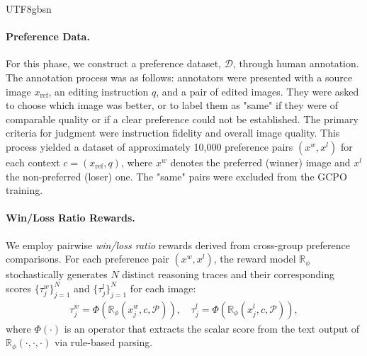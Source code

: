 \documentclass{llmxive}
\begin{document}
\begin{CJK*}{UTF8}{gbsn}
\vspace{-.5em}
\paragraph{Preference Data.}
For this phase, we construct a preference dataset, $\mathcal{D}$, through human annotation. The annotation process was as follows: annotators were presented with a source image $x_{\mathrm{ref}}$, an editing instruction $q$, and a pair of edited images. They were asked to choose which image was better, or to label them as "same" if they were of comparable quality or if a clear preference could not be established. The primary criteria for judgment were instruction fidelity and overall image quality. This process yielded a dataset of approximately 10,000 preference pairs $(x^w, x^l)$ for each context $c=(x_{\mathrm{ref}}, q)$, where $x^w$ denotes the preferred (winner) image and $x^l$ the non-preferred (loser) one. The "same" pairs were excluded from the GCPO training.


\paragraph{Win/Loss Ratio Rewards.}
We employ pairwise \emph{win/loss ratio} rewards derived from cross-group preference comparisons. 
For each preference pair $(x^w, x^l)$, the reward model $\mathbb{R}_\phi$ stochastically generates $N$ distinct reasoning traces and their corresponding scores $\{\tau_j^w\}_{j=1}^{N}$ and $\{\tau^l_j\}_{j=1}^{N}$ for each image:
\begin{align}
 \tau_j^w = \Phi\!\left(\mathbb{R}_\phi(x^w_j,c,\mathcal{P})\right), \quad \tau^l_j = \Phi\!\left(\mathbb{R}_\phi(x^l_j,c,\mathcal{P})\right),
\end{align}
where $\Phi(\cdot)$  is an operator that extracts the scalar score from the text output of $\mathbb{R}_\phi(\cdot,\cdot,\cdot)$ via rule-based parsing.


\end{CJK*}
\end{document}

